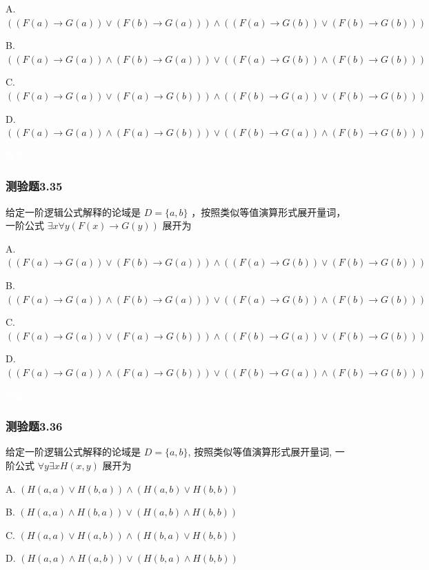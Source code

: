 \documentclass[UTF8, heading=true]{ctexart}
\begin{document}
A. $((F(a) \rightarrow G(a)) \vee(F(b) \rightarrow G(a))) \wedge((F(a) \rightarrow G(b)) \vee(F(b) \rightarrow G(b)))$

B. $((F(a) \rightarrow G(a)) \wedge(F(b) \rightarrow G(a))) \vee((F(a) \rightarrow G(b)) \wedge(F(b) \rightarrow G(b)))$

C. $((F(a) \rightarrow G(a)) \vee(F(a) \rightarrow G(b))) \wedge((F(b) \rightarrow G(a)) \vee(F(b) \rightarrow G(b)))$

D. $((F(a) \rightarrow G(a)) \wedge(F(a) \rightarrow G(b))) \vee((F(b) \rightarrow G(a)) \wedge(F(b) \rightarrow G(b)))$

\textcolor{white}{答案：C}

\subsubsection{测验题3.35}

给定一阶逻辑公式解释的论域是 $D=\{a, b\}$ ，按照类似等值演算形式展开量词，一阶公式 $\exists x \forall y(F(x) \rightarrow G(y))$ 展开为 $\qquad$

A. $
((F(a) \rightarrow G(a)) \vee(F(b) \rightarrow G(a))) \wedge((F(a) \rightarrow G(b)) \vee(F(b) \rightarrow G(b)))
$


B. $
((F(a) \rightarrow G(a)) \wedge(F(b) \rightarrow G(a))) \vee((F(a) \rightarrow G(b)) \wedge(F(b) \rightarrow G(b)))
$


C. $
((F(a) \rightarrow G(a)) \vee(F(a) \rightarrow G(b))) \wedge((F(b) \rightarrow G(a)) \vee(F(b) \rightarrow G(b)))
$


D.  $
((F(a) \rightarrow G(a)) \wedge(F(a) \rightarrow G(b))) \vee((F(b) \rightarrow G(a)) \wedge(F(b) \rightarrow G(b)))
$


\textcolor{white}{答案：D}


\subsubsection{测验题3.36}

给定一阶逻辑公式解释的论域是 $D=\{a, b\}$, 按照类似等值演算形式展开量词, 一阶公式 $\forall y \exists x H(x, y)$ 展开为 $\qquad$

A. $(H(a, a) \vee H(b, a)) \wedge(H(a, b) \vee H(b, b))$

B. $(H(a, a) \wedge H(b, a)) \vee(H(a, b) \wedge H(b, b))$

C. $(H(a, a) \vee H(a, b)) \wedge(H(b, a) \vee H(b, b))$

D. $(H(a, a) \wedge H(a, b)) \vee(H(b, a) \wedge H(b, b))$
\end{document}
